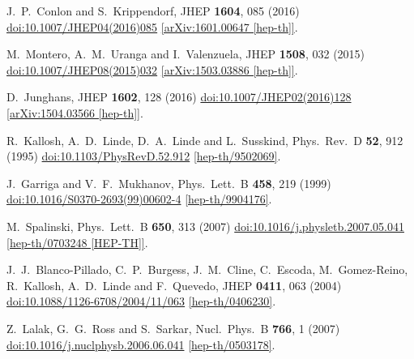 \documentclass[12pt]{article}
\begin{document}
\begin{thebibliography}{99}
  J.~P.~Conlon and S.~Krippendorf,
  JHEP {\bf 1604}, 085 (2016)
  \href{https://dx.doi.org/10.1007/JHEP04(2016)085}{doi:10.1007/JHEP04(2016)085}
  \href{https://arxiv.org/abs/1601.00647}{[arXiv:1601.00647 [hep-th]]}.

  M.~Montero, A.~M.~Uranga and I.~Valenzuela,
  JHEP {\bf 1508}, 032 (2015)
  \href{https://dx.doi.org/10.1007/JHEP08(2015)032}{doi:10.1007/JHEP08(2015)032}
  \href{https://arxiv.org/abs/1503.03886}{[arXiv:1503.03886 [hep-th]]}.

  D.~Junghans,
  JHEP {\bf 1602}, 128 (2016)
  \href{https://dx.doi.org/10.1007/JHEP02(2016)128}{doi:10.1007/JHEP02(2016)128}
  \href{https://arxiv.org/abs/1504.03566}{[arXiv:1504.03566 [hep-th]]}.

  R.~Kallosh, A.~D.~Linde, D.~A.~Linde and L.~Susskind,
  Phys.\ Rev.\ D {\bf 52}, 912 (1995)
  \href{https://dx.doi.org/10.1103/PhysRevD.52.912}{doi:10.1103/PhysRevD.52.912}
  \href{https://arxiv.org/abs/hep-th/9502069}{[hep-th/9502069]}.

  J.~Garriga and V.~F.~Mukhanov,
  Phys.\ Lett.\ B {\bf 458}, 219 (1999)
  \href{https://dx.doi.org/10.1016/S0370-2693(99)00602-4}{doi:10.1016/S0370-2693(99)00602-4}
  \href{https://arxiv.org/abs/hep-th/9904176}{[hep-th/9904176]}.

  M.~Spalinski,
  Phys.\ Lett.\ B {\bf 650}, 313 (2007)
  \href{https://dx.doi.org/10.1016/j.physletb.2007.05.041}{doi:10.1016/j.physletb.2007.05.041}
  \href{https://arxiv.org/abs/hep-th/0703248}{[hep-th/0703248 [HEP-TH]]}.

  J.~J.~Blanco-Pillado, C.~P.~Burgess, J.~M.~Cline, C.~Escoda, M.~Gomez-Reino, R.~Kallosh, A.~D.~Linde and F.~Quevedo,
  JHEP {\bf 0411}, 063 (2004)
  \href{https://dx.doi.org/10.1088/1126-6708/2004/11/063}{doi:10.1088/1126-6708/2004/11/063}
  \href{https://arxiv.org/abs/hep-th/0406230}{[hep-th/0406230]}.

  Z.~Lalak, G.~G.~Ross and S.~Sarkar,
  Nucl.\ Phys.\ B {\bf 766}, 1 (2007)
  \href{https://dx.doi.org/10.1016/j.nuclphysb.2006.06.041}{doi:10.1016/j.nuclphysb.2006.06.041}
  \href{https://arxiv.org/abs/hep-th/0503178}{[hep-th/0503178]}.


\end{thebibliography}
\end{document}
